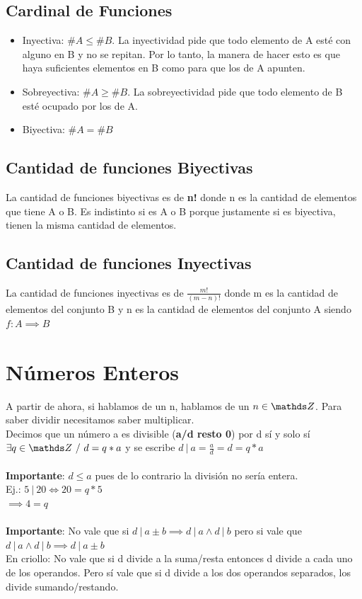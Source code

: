 \documentclass[10pt,a4paper]{article}
\begin{document}
\subsection*{Cardinal de Funciones}
\begin{itemize}
    \item Inyectiva: $\#A \le \#B$. La inyectividad pide que todo elemento de A esté con alguno en B y no se repitan. Por lo tanto, la manera de hacer esto es que haya suficientes elementos en B como para que los de A apunten.
    \item Sobreyectiva: $\#A \ge \#B$. La sobreyectividad pide que todo elemento de B esté ocupado por los de A.
    \item Biyectiva: $\#A = \#B$
\end{itemize}
\subsection*{Cantidad de funciones Biyectivas} 
La cantidad de funciones biyectivas es de \textbf{n!} donde n es la cantidad de elementos que tiene A o B. Es indistinto si es A o B porque justamente si es biyectiva, tienen la misma cantidad de elementos.
\subsection*{Cantidad de funciones Inyectivas}
La cantidad de funciones inyectivas es de \textbf{$\frac{m!}{(m-n)!}$} donde m es la cantidad de elementos del conjunto B y n es la cantidad de elementos del conjunto A siendo $f:A\implies B$
\section*{Números Enteros}
A partir de ahora, si hablamos de un n, hablamos de un $ n \in \ent$. Para saber dividir necesitamos saber multiplicar. \\
Decimos que un número a es divisible (\textbf{a/d resto 0}) por d sí y solo sí $ \exists q \in \ent \ / \ d = q * a$ y se escribe $ d \ | \ a = \frac{a}{d} = d = q * a$ \\ \\
\textbf{Importante}: $ d \le a$ pues de lo contrario la división no sería entera. \\
Ej.: $ 5 \ | \ 20 \iff 20 = q * 5$ \\
$ \implies 4 = q $ \\ \\ 
\textbf{Importante}: No vale que si $d \ | \ a \pm b \implies d \ | \ a \land d \ | \ b$ pero si vale que $ d \ | \ a \land d \ | \ b \implies d \ | \ a \pm b$ \\
En criollo: No vale que si d divide a la suma/resta entonces d divide a cada uno de los operandos. Pero sí vale que si d divide a los dos operandos separados, los divide sumando/restando.
\end{document}
